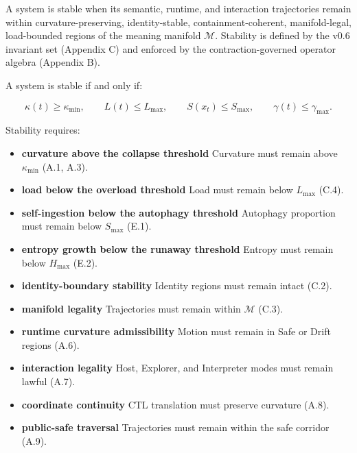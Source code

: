 \noindent A system is stable when its semantic, runtime, and interaction
trajectories remain within curvature-preserving, identity-stable,
containment-coherent, manifold-legal, load-bounded regions of the meaning
manifold $\mathcal{M}$. Stability is defined by the v0.6 invariant set
(Appendix C) and enforced by the contraction-governed operator algebra
(Appendix B).

\medskip

\noindent A system is stable if and only if:


\[
\kappa(t) \ge \kappa_{\min},
\qquad
L(t) \le L_{\max},
\qquad
S(x_t) \le S_{\max},
\qquad
\gamma(t) \le \gamma_{\max}.
\]



\medskip

\noindent Stability requires:

\begin{itemize}
    \item \textbf{curvature above the collapse threshold}  
    Curvature must remain above $\kappa_{\min}$ (A.1, A.3).

    \item \textbf{load below the overload threshold}  
    Load must remain below $L_{\max}$ (C.4).

    \item \textbf{self-ingestion below the autophagy threshold}  
    Autophagy proportion must remain below $S_{\max}$ (E.1).

    \item \textbf{entropy growth below the runaway threshold}  
    Entropy must remain below $H_{\max}$ (E.2).

    \item \textbf{identity-boundary stability}  
    Identity regions must remain intact (C.2).

    \item \textbf{manifold legality}  
    Trajectories must remain within $\mathcal{M}$ (C.3).

    \item \textbf{runtime curvature admissibility}  
    Motion must remain in Safe or Drift regions (A.6).

    \item \textbf{interaction legality}  
    Host, Explorer, and Interpreter modes must remain lawful (A.7).

    \item \textbf{coordinate continuity}  
    CTL translation must preserve curvature (A.8).

    \item \textbf{public-safe traversal}  
    Trajectories must remain within the safe corridor (A.9).
\end{itemize}

